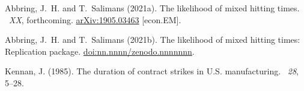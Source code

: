 \documentclass[fleqn,12pt]{article}
\begin{document}
\begin{thebibliography}{}
Abbring, J.~H. and T.~Salimans (2021a).
\newblock The likelihood of mixed hitting times.
~{\em XX\/}, forthcoming.
\newblock \href{https://arxiv.org/abs/1905.03463}{arXiv:1905.03463} [econ.EM].

Abbring, J.~H. and T.~Salimans (2021b).
\newblock The likelihood of mixed hitting times: Replication package.
\newblock \href{https://doi.org/nn.nnnn/zenodo.nnnnnnn}{doi:nn.nnnn/zenodo.nnnnnnn}.

Kennan, J. (1985).
\newblock The duration of contract strikes in {U.S.} manufacturing.
~{\em 28}, 5--28.

\end{thebibliography}
\end{document}
